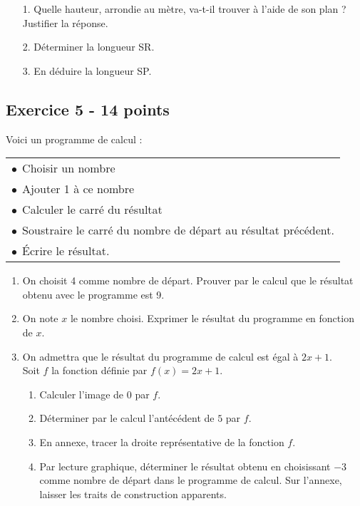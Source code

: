 {\medskip

\begin{enumerate}
    \item[1.] Quelle hauteur, arrondie au mètre, va-t-il trouver à l'aide de son plan ? Justifier la réponse.
    \item[2.] Déterminer la longueur SR. 
    \item[3.] En déduire la longueur SP.
\end{enumerate}

\newpage

\subsection*{Exercice 5 - 14 points}


\medskip

\parbox{0.3\linewidth}{Voici un programme de calcul :}\hfill
\parbox{0.68\linewidth}{
\begin{tabular}{|l|}\hline
$\bullet~~$Choisir un nombre\\
$\bullet~~$Ajouter 1 à ce nombre\\
$\bullet~~$Calculer le carré du résultat\\
$\bullet~~$Soustraire le carré du nombre de départ au résultat précédent.\\
$\bullet~~$Écrire le résultat.\\ \hline
\end{tabular}
}

\medskip

\begin{enumerate}
\item On choisit 4 comme nombre de départ. Prouver par le calcul que le résultat obtenu avec le programme
est 9.
\item On note $x$ le nombre choisi.\newline
	Exprimer le résultat du programme en fonction de $x$.\\

    \item On admettra que le résultat du programme de calcul est égal à $2x +1$. \\
    Soit $f$ la fonction définie par $f(x) = 2x + 1$.
	\begin{enumerate}
		\item Calculer l'image de 0 par $f$.
		\item Déterminer par le calcul l'antécédent de $5$ par $f$.
		\item En annexe, tracer la droite représentative de la fonction $f$.
		\item Par lecture graphique, déterminer le résultat obtenu en choisissant $- 3$ comme nombre de départ dans le programme de calcul. Sur l'annexe, laisser les traits de construction apparents.
	\end{enumerate}	
\end{enumerate}


}
